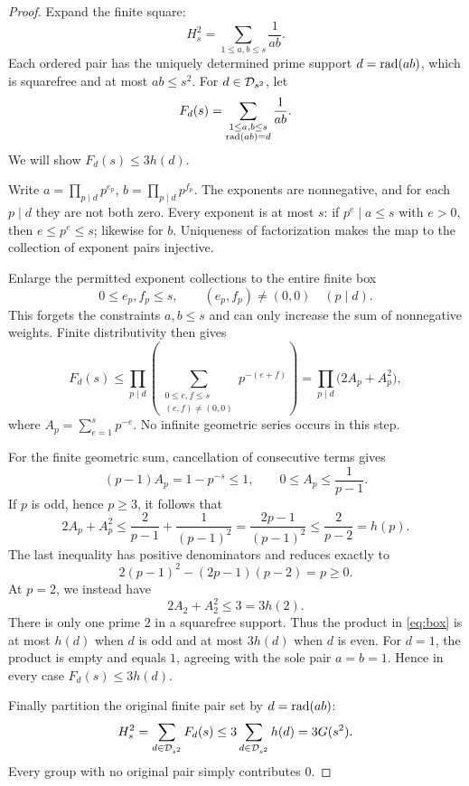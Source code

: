 \begin{proof}
Expand the finite square:
\[
 H_s^2=\sum_{1\le a,b\le s}\frac1{ab}.
\]
Each ordered pair has the uniquely determined prime support
\(d=\operatorname{rad}(ab)\), which is squarefree and at most \(ab\le s^2\).
For \(d\in\mathcal D_{s^2}\), let
\[
 F_d(s)=
 \sum_{\substack{1\le a,b\le s\\\operatorname{rad}(ab)=d}}\frac1{ab}.
\]
We will show \(F_d(s)\le3h(d)\).

Write \(a=\prod_{p\mid d}p^{e_p}\),
\(b=\prod_{p\mid d}p^{f_p}\).
The exponents are nonnegative, and for each \(p\mid d\) they are not both
zero. Every exponent is at most \(s\): if \(p^e\mid a\le s\) with
\(e>0\), then \(e\le p^e\le s\); likewise for \(b\).
Uniqueness of factorization makes the map to the collection of exponent
pairs injective.

Enlarge the permitted exponent collections to the entire finite box
\[
 0\le e_p,f_p\le s,\qquad (e_p,f_p)\ne(0,0)
 \quad(p\mid d).
\]
This forgets the constraints \(a,b\le s\) and can only increase the sum
of nonnegative weights. Finite distributivity then gives
\begin{equation}
 F_d(s)\le
 \prod_{p\mid d}
 \left(
 \sum_{\substack{0\le e,f\le s\\(e,f)\ne(0,0)}}p^{-(e+f)}
 \right)
 =\prod_{p\mid d}\bigl(2A_p+A_p^2\bigr),
 \label{eq:box}
\end{equation}
where \(A_p=\sum_{e=1}^s p^{-e}\).
No infinite geometric series occurs in this step.

For the finite geometric sum, cancellation of consecutive terms gives
\[
 (p-1)A_p=1-p^{-s}\le1,\qquad
 0\le A_p\le\frac1{p-1}.
\]
If \(p\) is odd, hence \(p\ge3\), it follows that
\[
 2A_p+A_p^2
 \le\frac{2}{p-1}+\frac1{(p-1)^2}
 =\frac{2p-1}{(p-1)^2}
 \le\frac2{p-2}=h(p).
\]
The last inequality has positive denominators and reduces exactly to
\[
 2(p-1)^2-(2p-1)(p-2)=p\ge0.
\]
At \(p=2\), we instead have
\[
 2A_2+A_2^2\le3=3h(2).
\]
There is only one prime \(2\) in a squarefree support. Thus the product in
\eqref{eq:box} is at most \(h(d)\) when \(d\) is odd and at most
\(3h(d)\) when \(d\) is even. For \(d=1\), the product is empty and equals
\(1\), agreeing with the sole pair \(a=b=1\).
Hence in every case \(F_d(s)\le3h(d)\).

Finally partition the original finite pair set by \(d=\operatorname{rad}(ab)\):
\[
 H_s^2=\sum_{d\in\mathcal D_{s^2}}F_d(s)
       \le3\sum_{d\in\mathcal D_{s^2}}h(d)=3G(s^2).
\]
Every group with no original pair simply contributes \(0\).
\end{proof}

